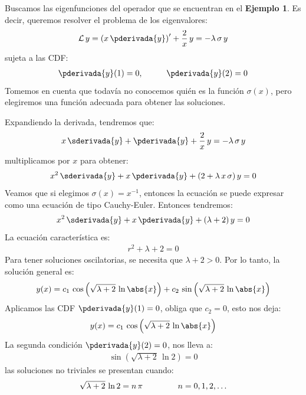 \begin{ejemplo}
Buscamos las eigenfunciones del operador que se encuentran en el \textbf{Ejemplo 1}. Es decir, queremos resolver el problema de los eigenvalores:
\begin{align}
\mathcal{L} \, y = \left( x \, \pderivada{y} \right)^{\prime} + \dfrac{2}{x} \, y = - \lambda \, \sigma \, y
\label{eq:ecuacion_04_14}
\end{align}
sujeta a las CDF:
\begin{align*}
\pderivada{y} (1) = 0, \hspace{1cm} \pderivada{y}(2) = 0
\end{align*}
Tomemos en cuenta que todavía no conocemos quién es la función $\sigma (x)$, pero elegiremos una función adecuada para obtener las soluciones.
\par
\noindent
Expandiendo la derivada, tendremos que:
\begin{align*}
x \, \sderivada{y} + \pderivada{y} + \dfrac{2}{x} \, y = - \lambda \, \sigma \, y
\end{align*}
multiplicamos por $x$ para obtener:
\begin{align*}
x^{2} \, \sderivada{y} + x \, \pderivada{y} + (2 + \lambda \, x \,  \sigma) \, y = 0
\end{align*}
Veamos que si elegimos $\sigma(x) = x^{-1}$, entonces la ecuación se puede expresar como una ecuación de tipo Cauchy-Euler. Entonces tendremos:
\begin{align*}
x^{2} \, \sderivada{y} + x \, \pderivada{y} + (\lambda + 2) \, y = 0
\end{align*}
La ecuación característica es:
\begin{align*}
r^{2} + \lambda + 2 = 0
\end{align*}
Para tener soluciones oscilatorias, se necesita que $\lambda + 2 > 0$. Por lo tanto, la solución general es:
\begin{align}
y(x) = c_{1} \, \cos \left( \sqrt{\lambda + 2} \, \ln \abs{x} \right) + c_{2} \, \sin \left( \sqrt{\lambda + 2} \, \ln \abs{x} \right)
\label{eq:ecuacion_04_15}
\end{align}
Aplicamos las CDF $\pderivada{y}(1) = 0$, obliga que $c_{2} = 0$, esto nos deja:
\begin{align*}
y(x) = c_{1} \, \cos \left( \sqrt{\lambda + 2} \, \ln \abs{x} \right)
\end{align*}
La segunda condición $\pderivada{y}(2) = 0$, nos lleva a:
\begin{align*}
\sin \left( \sqrt{\lambda + 2} \, \ln 2 \right) = 0
\end{align*}
las soluciones no triviales se presentan cuando:
\begin{align*}
\sqrt{\lambda + 2} \, \ln 2 = n \, \pi \hspace{1.5cm} n = 0, 1, 2, \ldots
\end{align*}


\end{ejemplo}
